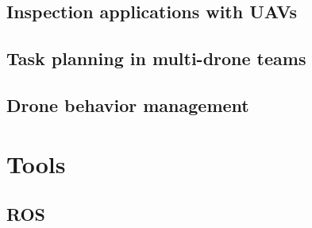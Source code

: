 

\subsection{Inspection applications with UAVs}
\label{subsec:InspectionApplicationsWithUAVs}

\subsection{Task planning in multi-drone teams}
\label{subsec:TaskPlanning}


\subsection{Drone behavior management}
\label{subsec:DroneBehaviorManagement}


\section{Tools}
\label{sec:PreviousStudy}

\subsection{ROS}
\label{subsec:ROS}


